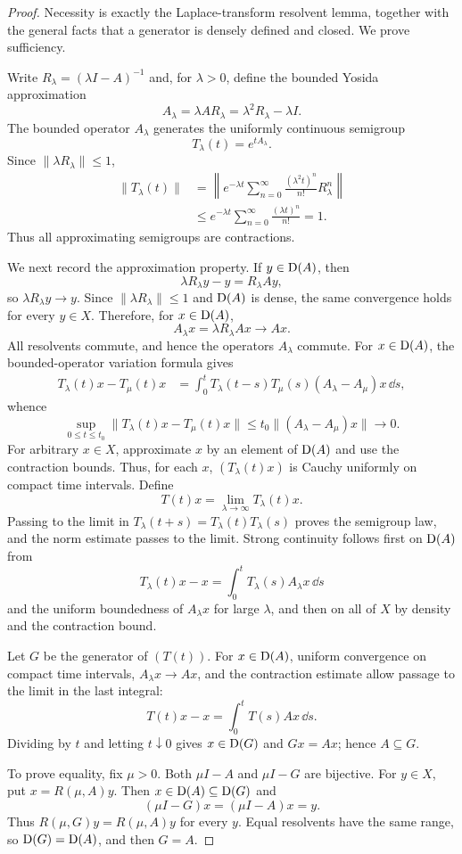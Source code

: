 \begin{proof}
Necessity is exactly the Laplace-transform resolvent lemma, together with the
general facts that a generator is densely defined and closed.  We prove
sufficiency.

Write $R_\lambda=(\lambda I-A)^{-1}$ and, for $\lambda>0$, define the bounded
Yosida approximation
\[
  A_\lambda
  =\lambda AR_\lambda
  =\lambda^2R_\lambda-\lambda I.
\]
The bounded operator $A_\lambda$ generates the uniformly continuous semigroup
\[
  T_\lambda(t)=e^{tA_\lambda}.
\]
Since $\|\lambda R_\lambda\|\le1$,
\[
\begin{aligned}
  \|T_\lambda(t)\|
   &=\left\|e^{-\lambda t}
      \sum_{n=0}^\infty\frac{(\lambda^2t)^n}{n!}R_\lambda^n\right\|\\
   &\le e^{-\lambda t}
      \sum_{n=0}^\infty\frac{(\lambda t)^n}{n!}=1.
\end{aligned}
\]
Thus all approximating semigroups are contractions.

We next record the approximation property.  If $y\in\operatorname{D}(A)$, then
\[
  \lambda R_\lambda y-y=R_\lambda Ay,
\]
so $\lambda R_\lambda y\to y$.  Since $\|\lambda R_\lambda\|\le1$ and
$\operatorname{D}(A)$ is dense, the same convergence holds for every $y\in X$.  Therefore,
for $x\in\operatorname{D}(A)$,
\[
  A_\lambda x=\lambda R_\lambda Ax\longrightarrow Ax.
\]
All resolvents commute, and hence the operators $A_\lambda$ commute.  For
$x\in\operatorname{D}(A)$, the bounded-operator variation formula gives
\[
\begin{aligned}
 T_\lambda(t)x-T_\mu(t)x
   &=\int_0^t
      T_\lambda(t-s)T_\mu(s)(A_\lambda-A_\mu)x\,\dd s,
\end{aligned}
\]
whence
\[
  \sup_{0\le t\le t_0}
  \|T_\lambda(t)x-T_\mu(t)x\|
  \le t_0\|(A_\lambda-A_\mu)x\|\longrightarrow0.
\]
For arbitrary $x\in X$, approximate $x$ by an element of $\operatorname{D}(A)$ and use
the contraction bounds.  Thus, for each $x$, $(T_\lambda(t)x)$ is Cauchy
uniformly on compact time intervals.  Define
\[
  T(t)x=\lim_{\lambda\to\infty}T_\lambda(t)x.
\]
Passing to the limit in
$T_\lambda(t+s)=T_\lambda(t)T_\lambda(s)$ proves the semigroup law, and the
norm estimate passes to the limit.  Strong continuity follows first on
$\operatorname{D}(A)$ from
\[
  T_\lambda(t)x-x=\int_0^tT_\lambda(s)A_\lambda x\,\dd s
\]
and the uniform boundedness of $A_\lambda x$ for large $\lambda$, and then on
all of $X$ by density and the contraction bound.

Let $G$ be the generator of $(T(t))$.  For $x\in\operatorname{D}(A)$, uniform convergence
on compact time intervals, $A_\lambda x\to Ax$, and the contraction estimate
allow passage to the limit in the last integral:
\[
  T(t)x-x=\int_0^tT(s)Ax\,\dd s.
\]
Dividing by $t$ and letting $t\downarrow0$ gives
$x\in\operatorname{D}(G)$ and $Gx=Ax$; hence $A\subseteq G$.

To prove equality, fix $\mu>0$.  Both $\mu I-A$ and $\mu I-G$ are bijective.
For $y\in X$, put $x=R(\mu,A)y$.  Then $x\in\operatorname{D}(A)\subseteq\operatorname{D}(G)$ and
\[
  (\mu I-G)x=(\mu I-A)x=y.
\]
Thus $R(\mu,G)y=R(\mu,A)y$ for every $y$.  Equal resolvents have the same
range, so $\operatorname{D}(G)=\operatorname{D}(A)$, and then $G=A$.
\end{proof}

